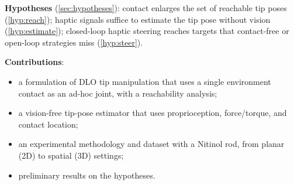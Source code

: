 \begin{outline}
  \item \textbf{Hypotheses} (\cref{sec:hypotheses}): contact enlarges the set
    of reachable tip poses (\ref{hyp:reach}); haptic signals suffice to estimate
    the tip pose without vision (\ref{hyp:estimate}); closed-loop haptic
    steering reaches targets that contact-free or open-loop strategies miss
    (\ref{hyp:steer}).
  \item \textbf{Contributions}:
    \begin{itemize}
      \item a formulation of DLO tip manipulation that uses a single
        environment contact as an ad-hoc joint, with a reachability analysis;
      \item a vision-free tip-pose estimator that uses proprioception,
        force/torque, and contact location;
      \item an experimental methodology and dataset with a Nitinol rod, from
        planar (2D) to spatial (3D) settings;
      \item preliminary results on the hypotheses.
    \end{itemize}
\end{outline}
